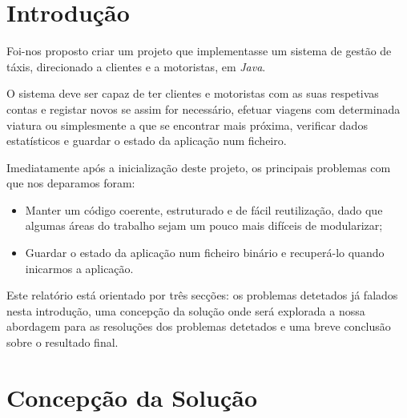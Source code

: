 \documentclass[a4paper,12pt]{report}
\begin{document}

\renewcommand*{\lstlistlistingname}{Lista de Funções}




\maketitle
\tableofcontents


\chapter{Introdução}

Foi-nos proposto criar um projeto que implementasse um sistema de gestão de táxis, direcionado a clientes e a motoristas, em {\sl Java}.

O sistema deve ser capaz de ter clientes e motoristas com as suas respetivas contas e registar novos se assim for necessário, efetuar viagens com determinada viatura ou simplesmente a que se encontrar mais próxima, verificar dados estatísticos e guardar o estado da aplicação num ficheiro.

Imediatamente após a inicialização deste projeto, os principais problemas com que nos deparamos foram:
\begin{itemize}
	\setlength\itemsep{0.00001em}
	\item Manter um código coerente, estruturado e de fácil reutilização, dado que algumas áreas do trabalho sejam um pouco mais difíceis de modularizar;
	\item Guardar o estado da aplicação num ficheiro binário e recuperá-lo quando inicarmos a aplicação.
\end{itemize}

Este relatório está orientado por três secções: os problemas detetados já falados nesta introdução, uma concepção da solução onde será explorada a nossa abordagem para as resoluções dos problemas detetados e uma breve conclusão sobre o resultado final.






\chapter{Concepção da Solução}
\end{document}
